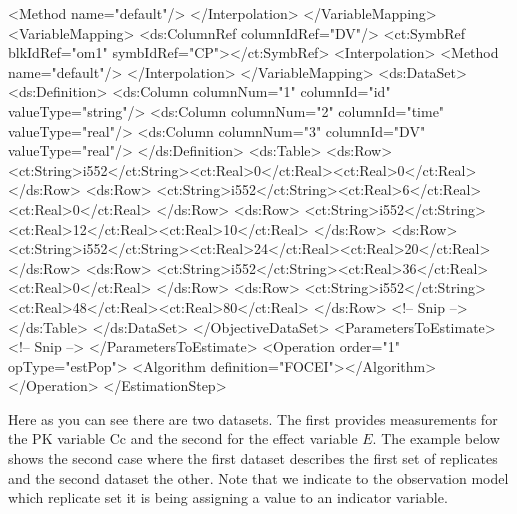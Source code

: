 \documentclass[a4paper,10pt]{article}
\begin{document}
\begin{xmlcode}
                <Method name="default"/>
            </Interpolation>
        </VariableMapping>
        <VariableMapping>
            <ds:ColumnRef  columnIdRef="DV"/>
            <ct:SymbRef blkIdRef="om1" symbIdRef="CP"></ct:SymbRef>
            <Interpolation>
                <Method name="default"/>
            </Interpolation>
        </VariableMapping>
        <ds:DataSet>
            <ds:Definition>
                <ds:Column columnNum="1" columnId="id" valueType="string"/>
                <ds:Column columnNum="2" columnId="time" valueType="real"/>
                <ds:Column columnNum="3" columnId="DV" valueType="real"/>
            </ds:Definition>
            <ds:Table>
                <ds:Row>
                    <ct:String>i552</ct:String><ct:Real>0</ct:Real><ct:Real>0</ct:Real>
                </ds:Row>
                <ds:Row>
                    <ct:String>i552</ct:String><ct:Real>6</ct:Real><ct:Real>0</ct:Real>
                </ds:Row>
                <ds:Row>
                    <ct:String>i552</ct:String><ct:Real>12</ct:Real><ct:Real>10</ct:Real>
                </ds:Row>
                <ds:Row>
                    <ct:String>i552</ct:String><ct:Real>24</ct:Real><ct:Real>20</ct:Real>
                </ds:Row>
                <ds:Row>
                    <ct:String>i552</ct:String><ct:Real>36</ct:Real><ct:Real>0</ct:Real>
                </ds:Row>
                <ds:Row>
                    <ct:String>i552</ct:String><ct:Real>48</ct:Real><ct:Real>80</ct:Real>
                </ds:Row>
                <!-- Snip -->
            </ds:Table>
        </ds:DataSet>
    </ObjectiveDataSet>
    <ParametersToEstimate>
      <!-- Snip -->
    </ParametersToEstimate>
    <Operation order="1" opType="estPop">
        <Algorithm definition="FOCEI"></Algorithm>
    </Operation>
</EstimationStep>
\end{xmlcode}
%
Here as you can see there are two datasets. The first provides
measurements for the PK variable $\mathrm{Cc}$ and the second for the
effect variable $E$. The example below shows the second case where the
first dataset describes the first set of replicates and the second
dataset the other. Note that we indicate to the observation model
which replicate set it is being assigning a value to an indicator variable.
%
\end{document}
